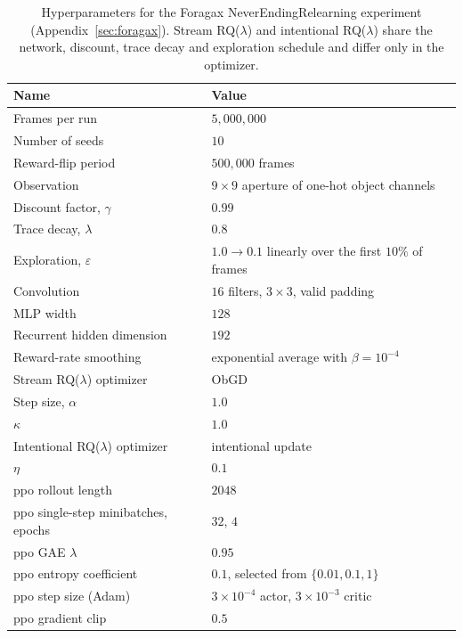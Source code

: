 \documentclass{article}
\begin{document}
\begin{table}[htbp]
\centering
\caption{Hyperparameters for the Foragax NeverEndingRelearning experiment
(Appendix~\ref{sec:foragax}). Stream RQ($\lambda$) and intentional RQ($\lambda$)
share the network, discount, trace decay and exploration schedule and differ
only in the optimizer.}
\label{tab:hparams-foragax}
\begin{tabular}{ll}
\toprule
Name & Value \\
\midrule
Frames per run                         & $5{,}000{,}000$ \\
Number of seeds                        & $10$ \\
Reward-flip period                     & $500{,}000$ frames \\
Observation                            & $9 \times 9$ aperture of one-hot object channels \\
Discount factor, $\gamma$              & $0.99$ \\
Trace decay, $\lambda$                 & $0.8$ \\
Exploration, $\varepsilon$             & $1.0 \to 0.1$ linearly over the first $10\%$ of frames \\
Convolution                            & $16$ filters, $3 \times 3$, valid padding \\
MLP width                              & $128$ \\
Recurrent hidden dimension             & $192$ \\
Reward-rate smoothing                  & exponential average with $\beta = 10^{-4}$ \\
\midrule
Stream RQ($\lambda$) optimizer          & ObGD \\
Step size, $\alpha$                    & $1.0$ \\
$\kappa$                               & $1.0$ \\
\midrule
Intentional RQ($\lambda$) optimizer    & intentional update \\
$\eta$                                 & $0.1$ \\
\midrule
\gls{ppo} rollout length               & $2048$ \\
\gls{ppo} single-step minibatches, epochs & $32$, $4$ \\
\gls{ppo} GAE $\lambda$                & $0.95$ \\
\gls{ppo} entropy coefficient          & $0.1$, selected from $\{0.01, 0.1, 1\}$ \\
\gls{ppo} step size (Adam)             & $3 \times 10^{-4}$ actor, $3 \times 10^{-3}$ critic \\
\gls{ppo} gradient clip                & $0.5$ \\
\bottomrule
\end{tabular}
\end{table}
\end{document}
